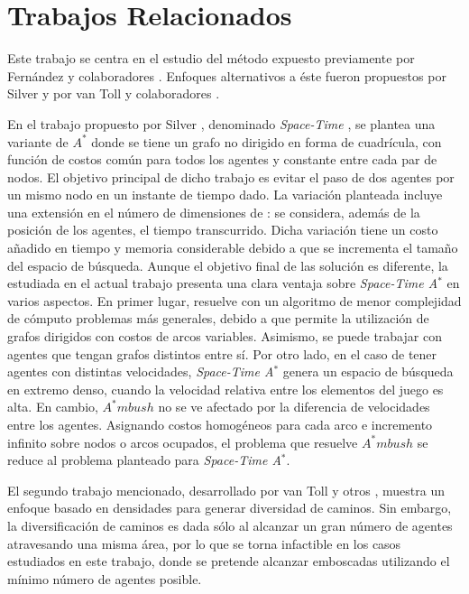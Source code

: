 \section{Trabajos Relacionados}
\label{sec:state_of_the_art}

Este trabajo se centra en el estudio del m\'etodo expuesto
previamente por Fern\'andez y colaboradores \cite{FGC12e}\cite{FGC12}.
Enfoques alternativos a \'este fueron propuestos por Silver \cite{Sil06}
y por van Toll y colaboradores \cite{TCG12}.

En el trabajo propuesto por Silver \cite{Sil06}, denominado
\textit{Space-Time \astar}, se plantea una variante de $A^*$ 
donde se tiene un grafo no dirigido en forma de cuadrícula,
con función de costos común para todos los agentes y 
constante entre cada par de nodos.
El objetivo principal de dicho trabajo es evitar el paso de
dos agentes por un mismo nodo en un instante de tiempo dado.
La variación planteada incluye una extensión en el número
de dimensiones de \astar: se considera, además de la posición
de los agentes, el tiempo transcurrido. Dicha variación tiene
un costo añadido en tiempo y memoria considerable debido a que
se incrementa el tamaño del espacio de búsqueda. Aunque el objetivo
final de las soluci\'on es diferente, la estudiada en el actual
trabajo presenta una clara ventaja sobre \textit{Space-Time A$^*$}
en varios aspectos. En primer lugar, resuelve con un algoritmo
de menor complejidad de c\'omputo problemas m\'as generales, debido a
que permite la utilizaci\'on de grafos dirigidos con costos de arcos
variables. Asimismo, se puede trabajar con agentes que
tengan grafos distintos entre sí.
Por otro lado, en el caso de tener agentes con distintas velocidades,
\textit{Space-Time A$^*$} genera un espacio de búsqueda en extremo
denso, cuando la velocidad relativa entre los e\-le\-men\-tos del juego es
alta. En cambio, $A^*mbush$ no se ve afectado por la diferencia de 
velocidades entre los agentes.
Asignando costos homogéneos para cada arco e incremento infinito
sobre nodos o arcos ocupados, el problema que resuelve $A^*mbush$
se reduce al problema planteado para \textit{Space-Time
A$^*$}.

El segundo trabajo mencionado, desarrollado por van Toll y otros
\cite{TCG12}, muestra un enfoque basado en densidades para generar
diversidad de caminos. Sin embargo, la diversificaci\'on de caminos
es dada s\'olo al alcanzar un gran n\'umero de agentes atravesando una
misma \'area, por lo que se torna infactible en los casos estudiados
en este trabajo, donde se pretende alcanzar emboscadas utilizando
el m\'inimo n\'umero de agentes posible.
